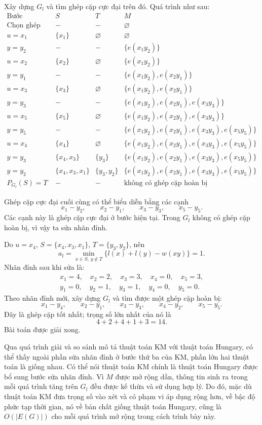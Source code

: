 \documentclass[11pt]{article}
\begin{document}
Xây dựng \(G_l\) và tìm ghép cặp cực đại trên đó. Quá trình như sau:
\[
\begin{array}{c|c|c|l}
\text{Bước} & S & T & M\\ \hline
\text{Chọn ghép cặp đầu} & - & - & \varnothing\\
u=x_1 & \{x_1\} & \varnothing & \varnothing\\
y=y_2 & - & - & \{e(x_1y_2)\}\\
u=x_2 & \{x_2\} & \varnothing & \{e(x_1y_2)\}\\
y=y_1 & - & - & \{e(x_1y_2),e(x_2y_1)\}\\
u=x_3 & \{x_3\} & \varnothing & \{e(x_1y_2),e(x_2y_1)\}\\
y=y_3 & - & - & \{e(x_1y_2),e(x_2y_1),e(x_3y_3)\}\\
u=x_5 & \{x_5\} & \varnothing &
\{e(x_1y_2),e(x_2y_1),e(x_3y_3)\}\\
y=y_5 & - & - &
\{e(x_1y_2),e(x_2y_1),e(x_3y_3),e(x_5y_5)\}\\
u=x_4 & \{x_4\} & \varnothing &
\{e(x_1y_2),e(x_2y_1),e(x_3y_3),e(x_5y_5)\}\\
y=y_3 & \{x_4,x_3\} & \{y_3\} &
\{e(x_1y_2),e(x_2y_1),e(x_3y_3),e(x_5y_5)\}\\
y=y_2 & \{x_4,x_3,x_1\} & \{y_3,y_2\} &
\{e(x_1y_2),e(x_2y_1),e(x_3y_3),e(x_5y_5)\}\\
P_{G_l}(S)=T & - & - & \text{không có ghép cặp hoàn bị}
\end{array}
\]

Ghép cặp cực đại cuối cùng có thể biểu diễn bằng các cạnh
\[
  x_1-y_2,\qquad x_2-y_1,\qquad x_3-y_3,\qquad x_5-y_5.
\]
Các cạnh này là ghép cặp cực đại ở bước hiện tại. Trong \(G_l\) không có ghép
cặp hoàn bị, vì vậy ta sửa nhãn đỉnh.

Do \(u=x_4\), \(S=\{x_4,x_3,x_1\}\), \(T=\{y_3,y_2\}\), nên
\[
  a_l=\min_{x\in S,\ y\notin T}\{l(x)+l(y)-w(xy)\}=1.
\]
Nhãn đỉnh sau khi sửa là:
\[
\begin{gathered}
x_1=4,\quad x_2=2,\quad x_3=3,\quad x_4=0,\quad x_5=3,\\
y_1=0,\quad y_2=1,\quad y_3=1,\quad y_4=0,\quad y_5=0.
\end{gathered}
\]
Theo nhãn đỉnh mới, xây dựng \(G_l\) và tìm được một ghép cặp hoàn bị:
\[
  x_1-y_4,\qquad x_2-y_1,\qquad x_3-y_3,\qquad x_4-y_2,\qquad x_5-y_5.
\]
Đây là ghép cặp tốt nhất; trọng số lớn nhất của nó là
\[
  4+2+4+1+3=14.
\]
Bài toán được giải xong.

Qua quá trình giải và so sánh mô tả thuật toán KM với thuật toán Hungary, có
thể thấy ngoài phần sửa nhãn đỉnh ở bước thứ ba của KM, phần lớn hai thuật
toán là giống nhau. Có thể nói thuật toán KM chính là thuật toán Hungary
được bổ sung bước sửa nhãn đỉnh. Vì \(M\) được mở rộng dần, thông tin sinh
ra trong mỗi quá trình tăng trên \(G_l\) đều được kế thừa và sử dụng hợp lý.
Do đó, mặc dù thuật toán KM đưa trọng số vào xét và có phạm vi áp dụng rộng
hơn, về bậc độ phức tạp thời gian, nó về bản chất giống thuật toán Hungary,
cũng là \(O(|E(G)|)\) cho mỗi quá trình mở rộng trong cách trình bày này.
\end{document}
